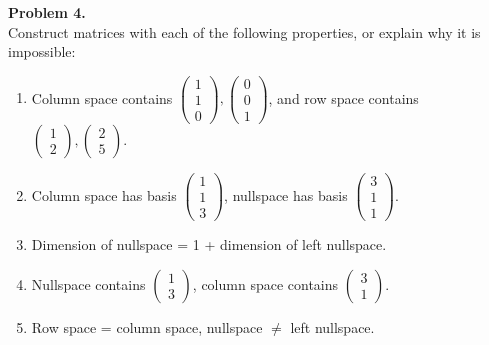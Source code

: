 \documentclass[11pt]{article}
\begin{document}
\noindent \textbf{Problem 4.}\\
Construct matrices with each of the following properties, or explain why it is impossible:
\begin{enumerate}
\item Column space contains $\begin{pmatrix} 1 \\ 1 \\ 0 \end{pmatrix}, \begin{pmatrix} 0 \\ 0 \\ 1 \end{pmatrix}$, and row space contains $\begin{pmatrix} 1 \\ 2 \end{pmatrix}, \begin{pmatrix} 2 \\ 5 \end{pmatrix}$.
\item Column space has basis $\begin{pmatrix} 1 \\ 1 \\ 3 \end{pmatrix}$, nullspace has basis $\begin{pmatrix} 3 \\ 1 \\ 1 \end{pmatrix}$.
\item Dimension of nullspace = 1 + dimension of left nullspace.
\item Nullspace contains $\begin{pmatrix} 1 \\ 3 \end{pmatrix}$, column space contains $\begin{pmatrix} 3 \\ 1 \end{pmatrix}$.
\item Row space = column space, nullspace $\neq$ left nullspace.
\end{enumerate}

\
\end{document}
